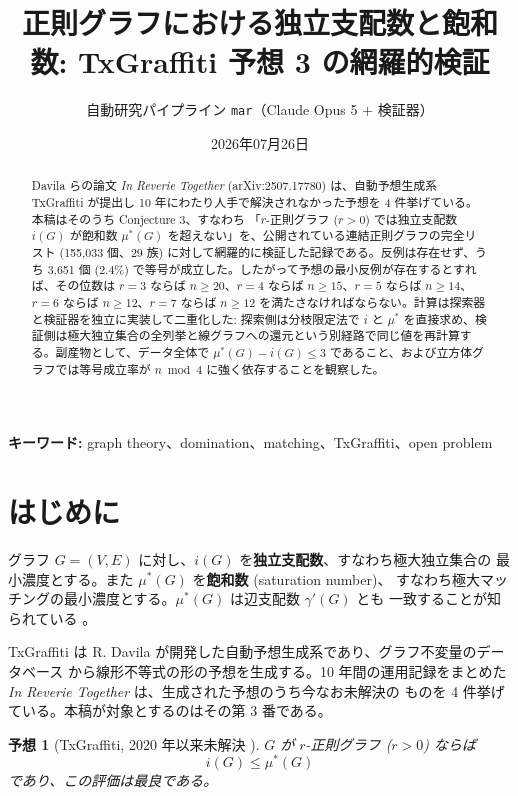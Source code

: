 \documentclass[paper=a4,fontsize=10.5pt,jafontsize=10.5pt]{jlreq}
\title{正則グラフにおける独立支配数と飽和数: TxGraffiti 予想 3 の網羅的検証}
\author{自動研究パイプライン \texttt{mar}（Claude Opus 5 + 検証器）}
\date{2026年07月26日}
\theoremstyle{plain}
\newtheorem{conjecture}[theorem]{予想}
\theoremstyle{definition}
\begin{document}
\maketitle

\begin{abstract}
Davila らの論文 \emph{In Reverie Together} (arXiv:2507.17780) は、自動予想生成系 TxGraffiti が提出し 10 年にわたり人手で解決されなかった予想を 4 件挙げている。本稿はそのうち Conjecture 3、すなわち 「$r$-正則グラフ ($r>0$) では独立支配数 $i(G)$ が飽和数 $\mu^*(G)$ を超えない」を、公開されている連結正則グラフの完全リスト (155,033 個、29 族) に対して網羅的に検証した記録である。反例は存在せず、うち 3,651 個 (2.4\%) で等号が成立した。したがって予想の最小反例が存在するとすれば、その位数は $r = 3$ ならば $n \ge 20$、$r = 4$ ならば $n \ge 15$、$r = 5$ ならば $n \ge 14$、$r = 6$ ならば $n \ge 12$、$r = 7$ ならば $n \ge 12$ を満たさなければならない。計算は探索器と検証器を独立に実装して二重化した: 探索側は分枝限定法で $i$ と $\mu^*$ を直接求め、検証側は極大独立集合の全列挙と線グラフへの還元という別経路で同じ値を再計算する。副産物として、データ全体で $\mu^*(G) - i(G) \le 3$ であること、および立方体グラフでは等号成立率が $n \bmod 4$ に強く依存することを観察した。
\end{abstract}

\noindent\textbf{キーワード:} graph theory、domination、matching、TxGraffiti、open problem


\section{はじめに}

グラフ $G=(V,E)$ に対し、$i(G)$ を\textbf{独立支配数}、すなわち極大独立集合の
最小濃度とする。また $\mu^*(G)$ を\textbf{飽和数} (saturation number)、
すなわち極大マッチングの最小濃度とする。$\mu^*(G)$ は辺支配数 $\gamma'(G)$ とも
一致することが知られている \cite{bfhmr}。

TxGraffiti は R. Davila が開発した自動予想生成系であり、グラフ不変量のデータベース
から線形不等式の形の予想を生成する。10 年間の運用記録をまとめた
\emph{In Reverie Together} \cite{reverie} は、生成された予想のうち今なお未解決の
ものを 4 件挙げている。本稿が対象とするのはその第 3 番である。

\begin{conjecture}[TxGraffiti, 2020 年以来未解決 \cite{reverie}]
\label{conj:main}
$G$ が $r$-正則グラフ ($r > 0$) ならば
\[ i(G) \le \mu^*(G) \]
であり、この評価は最良である。
\end{conjecture}
\end{document}
